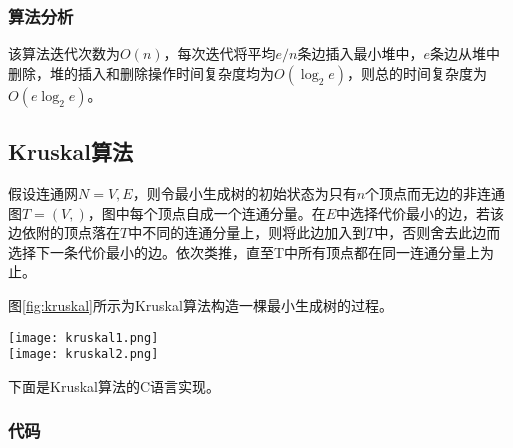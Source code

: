 \subsubsection{算法分析}
该算法迭代次数为$O(n)$，每次迭代将平均$e/n$条边插入最小堆中，$e$条边从堆中删除，堆的插入和删除操作时间复杂度均为$O(\log_2 e)$，则总的时间复杂度为 $O(e\log_2e)$。

\subsection{Kruskal算法}
\label{sec:kruskal}
假设连通网$N={V, E}$，则令最小生成树的初始状态为只有$n$个顶点而无边的非连通图$T=(V, {})$，图中每个顶点自成一个连通分量。在$E$中选择代价最小的边，若该边依附的顶点落在$T$中不同的连通分量上，则将此边加入到$T$中，否则舍去此边而选择下一条代价最小的边。依次类推，直至T中所有顶点都在同一连通分量上为止。

图\ref{fig:kruskal}所示为Kruskal算法构造一棵最小生成树的过程。

\begin{center}
\texttt{[image: kruskal1.png]}\\
\texttt{[image: kruskal2.png]}\\
\label{fig:kruskal}
\end{center}

下面是Kruskal算法的C语言实现。

\subsubsection{代码}

